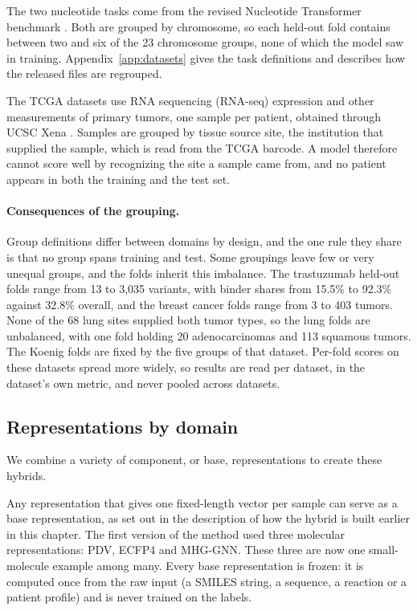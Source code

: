 The two nucleotide tasks come from the revised Nucleotide Transformer benchmark \citep{DallaTorre2025}. Both are grouped by chromosome, so each held-out fold contains between two and six of the 23 chromosome groups, none of which the model saw in training. Appendix~\ref{app:datasets} gives the task definitions and describes how the released files are regrouped.

The TCGA datasets use RNA sequencing (RNA-seq) expression and other measurements of primary tumors, one sample per patient, obtained through UCSC Xena \citep{Goldman2020}. Samples are grouped by tissue source site, the institution that supplied the sample, which is read from the TCGA barcode. A model therefore cannot score well by recognizing the site a sample came from, and no patient appears in both the training and the test set.

\paragraph{Consequences of the grouping.} Group definitions differ between domains by design, and the one rule they share is that no group spans training and test. Some groupings leave few or very unequal groups, and the folds inherit this imbalance. The trastuzumab held-out folds range from 13 to 3,035 variants, with binder shares from 15.5\% to 92.3\% against 32.8\% overall, and the breast cancer folds range from 3 to 403 tumors. None of the 68 lung sites supplied both tumor types, so the lung folds are unbalanced, with one fold holding 20 adenocarcinomas and 113 squamous tumors. The Koenig folds are fixed by the five groups of that dataset. Per-fold scores on these datasets spread more widely, so results are read per dataset, in the dataset's own metric, and never pooled across datasets.
\subsection{Representations by domain}

We combine a variety of component, or base, representations to create these hybrids.

Any representation that gives one fixed-length vector per sample can serve as a base representation, as set out in the description of how the hybrid is built earlier in this chapter. The first version of the method used three molecular representations: PDV, ECFP4 and MHG-GNN. These three are now one small-molecule example among many. Every base representation is frozen: it is computed once from the raw input (a SMILES string, a sequence, a reaction or a patient profile) and is never trained on the labels.


